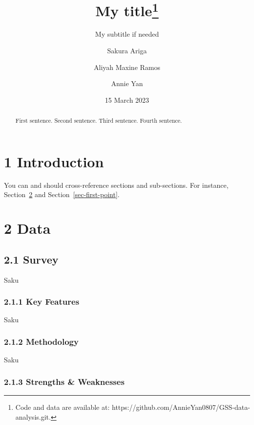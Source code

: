 \documentclass[
  letterpaper,
  DIV=11,
  numbers=noendperiod]{scrartcl}
\title{My title\thanks{Code and data are available at:
https://github.com/AnnieYan0807/GSS-data-analysis.git.}}
\subtitle{My subtitle if needed}
\author{Sakura Ariga \and Aliyah Maxine Ramos \and Annie Yan}
\date{15 March 2023}
\begin{document}
\maketitle
\begin{abstract}
First sentence. Second sentence. Third sentence. Fourth sentence.
\end{abstract}
\ifdefined\Shaded\renewenvironment{Shaded}{\begin{tcolorbox}[interior hidden, breakable, boxrule=0pt, sharp corners, borderline west={3pt}{0pt}{shadecolor}, frame hidden, enhanced]}{\end{tcolorbox}}\fi

\hypertarget{introduction}{%
\section{1 Introduction}\label{introduction}}

You can and should cross-reference sections and sub-sections. For
instance, Section~\ref{sec-data} and Section~\ref{sec-first-point}.

\hypertarget{sec-data}{%
\section{2 Data}\label{sec-data}}

\hypertarget{survey}{%
\subsection{2.1 Survey}\label{survey}}

Saku

\hypertarget{key-features}{%
\subsubsection{2.1.1 Key Features}\label{key-features}}

Saku

\hypertarget{methodology}{%
\subsubsection{2.1.2 Methodology}\label{methodology}}

Saku

\hypertarget{strengths-weaknesses}{%
\subsubsection{2.1.3 Strengths \&
Weaknesses}\label{strengths-weaknesses}}
\end{document}
